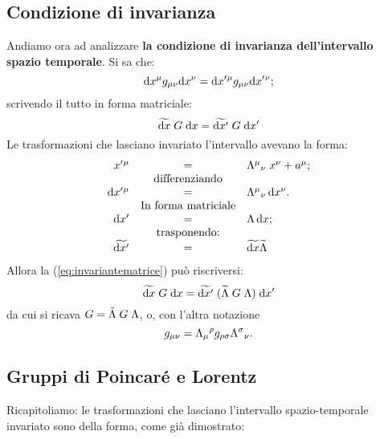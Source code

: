 \subsection{Condizione di invarianza}
Andiamo ora ad analizzare \textbf{la condizione di invarianza
dell'intervallo spazio temporale}. Si sa che:
\begin{equation}
 \mathrm{d} x^{\mu}g_{\mu\nu}\mathrm{d} x^{\nu}={\mathrm{d} x'}{}^{\mu}g_{\mu\nu}{\mathrm{d} x'}{}^{\nu};
\end{equation}
scrivendo il tutto in forma matriciale:
\begin{equation}
\widetilde{\mathrm{d} x}\;G\;\mathrm{d} x=\widetilde{\mathrm{d} x'}\;G\;\mathrm{d} x'
\label{eq:invariantematrice}
\end{equation}
Le trasformazioni che lasciano invariato l'intervallo avevano la
forma:
\begin{equation}\begin{array}{rcl}
{x'}{}^{\mu}      & = &\Lambda^{\mu}{}_{\nu}\;x^{\nu}+a^{\mu}; \\
                  & \mbox{dif\mbox{}ferenziando}& \\
{\mathrm{d} x'}{}^{\mu}  & = & \Lambda^{\mu}{}_{\nu}\,\mathrm{d} x^{\nu}. \\ 
                  & \mbox{In forma matriciale} & \\
\mathrm{d} x'            & = &\Lambda\, \mathrm{d} x; \\
                  & \mbox{trasponendo:} &\\
\widetilde{\mathrm{d} x'}& = &\widetilde{\mathrm{d} x}\widetilde{\Lambda}
\end{array}
\end{equation}
Allora la (\ref{eq:invariantematrice}) pu\`o riscriversi:
\begin{equation}
\widetilde{\mathrm{d} x} \; G \; \mathrm{d} x=\widetilde{\mathrm{d} x'} \; 
(\widetilde{\Lambda} \; G \; \Lambda) \; \mathrm{d} x'
\end{equation}
da cui si ricava $G=\tilde{\Lambda}\;G\;\Lambda$, o, con l'altra notazione
\begin{equation}
 g_{\mu \nu} = \Lambda_{\mu}{}^{\rho} g_{\rho \sigma} \Lambda^{\sigma}{}_{\nu}.
\end{equation}
\subsection{Gruppi di Poincar\'e e Lorentz}
Ricapitoliamo: le trasformazioni che lasciano l'intervallo
spazio-temporale invariato sono della forma, come gi\`a dimostrato:

